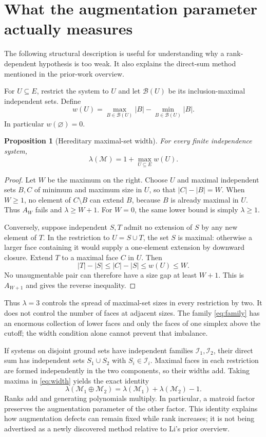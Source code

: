 \documentclass[11pt,letterpaper]{article}
\numberwithin{equation}{section}
\newtheorem{proposition}[theorem]{Proposition}
\theoremstyle{definition}
\theoremstyle{remark}
\newcommand{\I}{\mathcal I}
\newcommand{\M}{\mathcal M}
\begin{document}
\section{What the augmentation parameter actually measures}
\label{sec:gap}
The following structural description is useful for understanding why a
rank-dependent hypothesis is too weak. It also explains the direct-sum
method mentioned in the prior-work overview.

For $U\subseteq E$, restrict the system to $U$ and let
$\mathcal B(U)$ be its inclusion-maximal independent sets. Define
\[
 w(U)=\max_{B\in\mathcal B(U)}|B|-\min_{B\in\mathcal B(U)}|B|.
\]
In particular $w(\varnothing)=0$.

\begin{proposition}[Hereditary maximal-set width]\label{prop:width}
For every finite independence system,
\begin{equation}\label{eq:width}
 \lambda(\M)=1+\max_{U\subseteq E}w(U).
\end{equation}
\end{proposition}
\begin{proof}
Let $W$ be the maximum on the right. Choose $U$ and maximal independent
sets $B,C$ of minimum and maximum size in $U$, so that $|C|-|B|=W$.
When $W\ge1$, no element of $C\setminus B$ can extend $B$, because $B$
is already maximal in $U$. Thus $A_W$ fails and $\lambda\ge W+1$.
For $W=0$, the same lower bound is simply $\lambda\ge1$.

Conversely, suppose independent $S,T$ admit no extension of $S$ by any
new element of $T$. In the restriction to $U=S\cup T$, the set $S$ is
maximal: otherwise a larger face containing it would supply a one-element
extension by downward closure. Extend $T$ to a maximal face $C$ in $U$.
Then
\[
 |T|-|S|\le |C|-|S|\le w(U)\le W.
\]
No unaugmentable pair can therefore have a size gap at least $W+1$.
This is $A_{W+1}$ and gives the reverse inequality.
\end{proof}

Thus $\lambda=3$ controls the spread of maximal-set sizes in every
restriction by two. It does not control the number of faces at adjacent
sizes. The family \eqref{eq:family} has an enormous collection of lower
faces and only the faces of one simplex above the cutoff; the width
condition alone cannot prevent that imbalance.

If systems on disjoint ground sets have independent families
$\I_1,\I_2$, their direct sum has independent sets $S_1\cup S_2$ with
$S_i\in\I_i$. Maximal faces in each restriction are formed independently
in the two components, so their widths add. Taking maxima in
\eqref{eq:width} yields the exact identity
\begin{equation}\label{eq:directsum}
 \lambda(\M_1\oplus\M_2)
 =\lambda(\M_1)+\lambda(\M_2)-1.
\end{equation}
Ranks add and generating polynomials multiply. In particular, a matroid
factor preserves the augmentation parameter of the other factor. This
identity explains how augmentation defects can remain fixed while rank
increases; it is not being advertised as a newly discovered method
relative to Li's prior overview.
\end{document}
